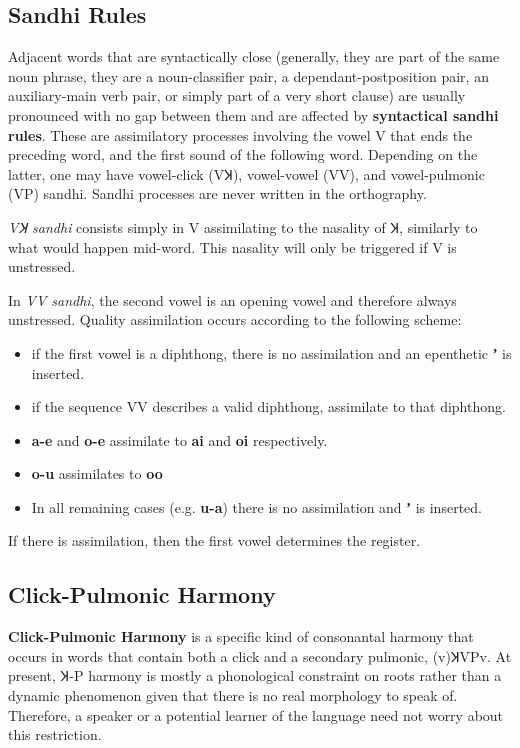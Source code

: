 \documentclass[11pt,a5paper]{book}
\newcommand{\qcn}[1]{\textcolor{AccentText}{\large\textbf{#1}}}
\begin{document}
\subsection{Sandhi Rules}

Adjacent words that are syntactically close (generally, they are part of the same noun phrase, they are a noun-classifier pair, a de\-pen\-dant-post\-po\-si\-tion pair, an auxiliary-main verb pair, or simply part of a very short clause) are usually pronounced with no gap between them and are affected by \textbf{syntactical sandhi rules}.  These are assimilatory processes involving the vowel V that ends the preceding word, and the first sound of the following word. Depending on the latter, one may have vowel-click (VꞰ), vowel-vowel (VV), and vowel-pulmonic (VP) sandhi. Sandhi processes are never written in the orthography.

\emph{VꞰ sandhi} consists simply in V assimilating to the nasality of Ʞ, similarly to what would happen mid-word. This nasality will only be triggered if V is unstressed.

In \emph{VV sandhi}, the second vowel is an opening vowel and therefore always unstressed. Quality assimilation occurs according to the following scheme:

\begin{itemize}
\item if the first vowel is a diphthong, there is no assimilation and an epenthetic \qcn{ʼ} is inserted.
\item if the sequence VV describes a valid diphthong, assimilate to that diphthong.
\item \qcn{a-e} and \qcn{o-e} assimilate to \qcn{ai} and \qcn{oi} respectively.
\item \qcn{o-u} assimilates to \qcn{oo}
\item In all remaining cases (e.g. \qcn{u-a}) there is no assimilation and \qcn{ʼ} is inserted.
\end{itemize}

If there is assimilation, then the first vowel determines the register.

\subsection{Click-Pulmonic Harmony}

\textbf{Click-Pulmonic Harmony} is a specific kind of consonantal harmony that occurs in words that contain both a click and a secondary pulmonic, (v)ꞰVPv. At present, Ʞ-P harmony is mostly a phonological constraint on roots rather than a dynamic phenomenon given that there is no real morphology to speak of. Therefore, a speaker or a potential learner of the language need not worry about this restriction.
\end{document}
